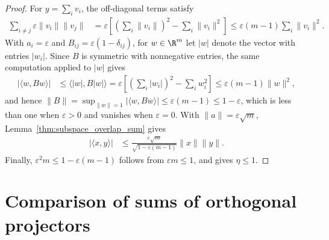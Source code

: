 \begin{proof}
    \leanok
    For $y=\sum_i v_i$, the off-diagonal terms satisfy
    \begin{align}
        \sum_{i\neq j}\varepsilon\lVert v_i\rVert\lVert v_j\rVert
         & =\varepsilon\left[\left(\sum_i\lVert v_i\rVert\right)^2
            -\sum_i\lVert v_i\rVert^2\right]
        \leq\varepsilon(m-1)\sum_i\lVert v_i\rVert^2.
    \end{align}
    With $a_i=\varepsilon$ and $B_{ij}=\varepsilon(1-\delta_{ij})$, for
    $w\in\R^m$ let $|w|$ denote the vector with entries $|w_i|$. Since $B$ is
    symmetric with nonnegative entries, the same computation applied to $|w|$
    gives
    \begin{align}
        |\langle w,Bw\rangle|
         & \leq\langle|w|,B|w|\rangle
        =\varepsilon\left[\left(\sum_i|w_i|\right)^2-\sum_i w_i^2\right]
        \leq\varepsilon(m-1)\lVert w\rVert^2,
    \end{align}
    and hence
    $\lVert B\rVert=\sup_{\lVert w\rVert=1}|\langle w,Bw\rangle|
        \leq\varepsilon(m-1)\leq1-\varepsilon$, which is less
    than one when $\varepsilon>0$ and vanishes when $\varepsilon=0$. With
    $\lVert a\rVert=\varepsilon\sqrt m$,
    Lemma~\ref{thm:subspace_overlap_sum} gives
    \begin{align}
        |\langle x,y\rangle|
         & \leq\frac{\varepsilon\sqrt m}{\sqrt{1-\varepsilon(m-1)}}
        \lVert x\rVert\lVert y\rVert.
    \end{align}
    Finally,
    $\varepsilon^2m\leq1-\varepsilon(m-1)$ follows from
    $\varepsilon m\leq1$, and gives $\eta\leq1$.
\end{proof}

\section{Comparison of sums of orthogonal projectors}

